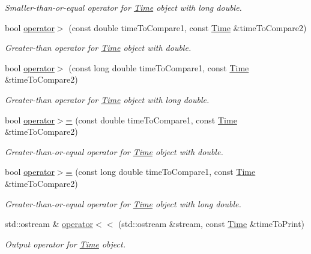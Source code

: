 \begin{DoxyCompactItemize}
\begin{DoxyCompactList}\small\item\em Smaller-\/than-\/or-\/equal operator for \hyperlink{classtudat_1_1Time}{Time} object with long double. \end{DoxyCompactList}\item 
bool \hyperlink{classtudat_1_1Time_a6f407f276218352fa72931e748e148cf}{operator$>$} (const double time\+To\+Compare1, const \hyperlink{classtudat_1_1Time}{Time} \&time\+To\+Compare2)
\begin{DoxyCompactList}\small\item\em Greater-\/than operator for \hyperlink{classtudat_1_1Time}{Time} object with double. \end{DoxyCompactList}\item 
bool \hyperlink{classtudat_1_1Time_a784e2a0e9abdc2473ecbad9bc1bb17f7}{operator$>$} (const long double time\+To\+Compare1, const \hyperlink{classtudat_1_1Time}{Time} \&time\+To\+Compare2)
\begin{DoxyCompactList}\small\item\em Greater-\/than operator for \hyperlink{classtudat_1_1Time}{Time} object with long double. \end{DoxyCompactList}\item 
bool \hyperlink{classtudat_1_1Time_a893dc2716b2f92398e51849d6a6bd980}{operator$>$=} (const double time\+To\+Compare1, const \hyperlink{classtudat_1_1Time}{Time} \&time\+To\+Compare2)
\begin{DoxyCompactList}\small\item\em Greater-\/than-\/or-\/equal operator for \hyperlink{classtudat_1_1Time}{Time} object with double. \end{DoxyCompactList}\item 
bool \hyperlink{classtudat_1_1Time_a0d9171b54df8bd6b9495a3a1b59b1e70}{operator$>$=} (const long double time\+To\+Compare1, const \hyperlink{classtudat_1_1Time}{Time} \&time\+To\+Compare2)
\begin{DoxyCompactList}\small\item\em Greater-\/than-\/or-\/equal operator for \hyperlink{classtudat_1_1Time}{Time} object with long double. \end{DoxyCompactList}\item 
std\+::ostream \& \hyperlink{classtudat_1_1Time_aac7c1a215af3271486df0efd87d5911d}{operator$<$$<$} (std\+::ostream \&stream, const \hyperlink{classtudat_1_1Time}{Time} \&time\+To\+Print)\hypertarget{classtudat_1_1Time_aac7c1a215af3271486df0efd87d5911d}{}\label{classtudat_1_1Time_aac7c1a215af3271486df0efd87d5911d}

\begin{DoxyCompactList}\small\item\em Output operator for \hyperlink{classtudat_1_1Time}{Time} object. \end{DoxyCompactList}\end{DoxyCompactItemize}


